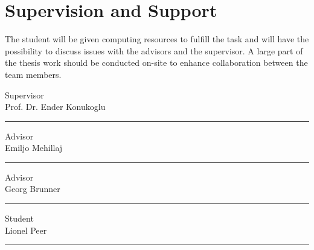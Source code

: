 \documentclass[a4paper]{article}
\begin{document}
\section{Supervision and Support}
The student will be given computing resources to fulfill the task and will have the possibility to discuss issues with the advisors and the supervisor. A large part of the thesis work should be conducted on-site to enhance collaboration between the team members.

\vspace{2cm}

Supervisor\\
Prof. Dr. Ender Konukoglu \\ \hrule
\vspace{1cm}

Advisor \\
Emiljo Mehillaj \\ \hrule
\vspace{1cm}


Advisor \\
Georg Brunner \\ \hrule
\vspace{1cm}


Student \\
Lionel Peer \\ \hrule
\vspace{1cm}


\printbibliography[title=References]
\end{document}
